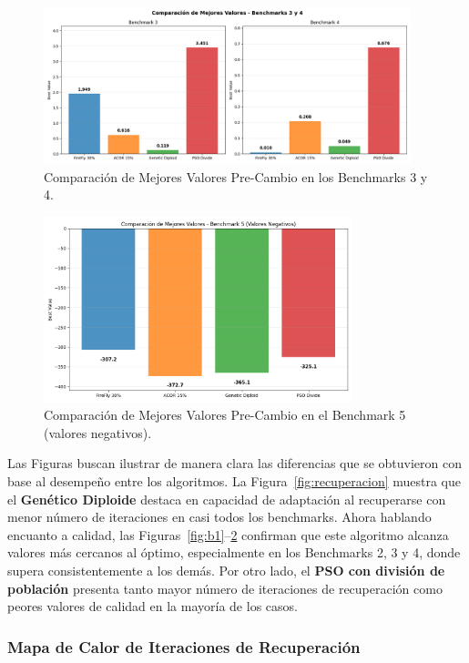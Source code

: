 \documentclass[10pt]{article}
\begin{document}
\begin{figure}[H]
    \centering
    \includegraphics[width=0.95\textwidth]{imagenes/b3_y_b4.png}
    \caption{Comparación de Mejores Valores Pre-Cambio en los Benchmarks 3 y 4.}
    \label{fig:b3b4}
\end{figure}

\begin{figure}[H]
    \centering
    \includegraphics[width=0.8\textwidth]{imagenes/b5.png}
    \caption{Comparación de Mejores Valores Pre-Cambio en el Benchmark 5 (valores negativos).}
    \label{fig:b5}
\end{figure}

Las Figuras buscan ilustrar de manera clara las diferencias que se obtuvieron con base al desempeño entre los algoritmos. La Figura~\ref{fig:recuperacion} muestra que el \textbf{Genético Diploide} destaca en capacidad de adaptación al recuperarse con menor número de iteraciones en casi todos los benchmarks. Ahora hablando encuanto a calidad, las Figuras~\ref{fig:b1}--\ref{fig:b5} confirman que este algoritmo alcanza valores más cercanos al óptimo, especialmente en los Benchmarks 2, 3 y 4, donde supera consistentemente a los demás. Por otro lado, el \textbf{PSO con división de población} presenta tanto mayor número de iteraciones de recuperación como peores valores de calidad en la mayoría de los casos.

\subsubsection*{Mapa de Calor de Iteraciones de Recuperación}
\end{document}
